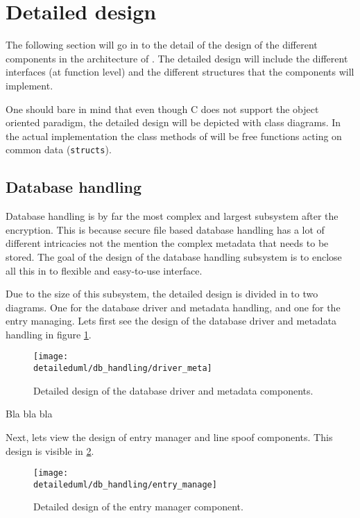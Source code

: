 \section{Detailed design}

The following section will go in to the detail of the design of the different
components in the architecture of \pman. The detailed design will include the
different interfaces (at function level) and the different structures that the
components will implement.

One should bare in mind that even though C does not support the object oriented
paradigm, the detailed design will be depicted with class diagrams. In the
actual implementation the class methods of will be free functions acting on
common data (\texttt{structs}).

\subsection{Database handling}

Database handling is by far the most complex and largest subsystem after
the encryption. This is because secure file based database handling has a lot
of different intricacies not the mention the complex metadata that needs to
be stored. The goal of the design of the database handling subsystem is to
enclose all this in to flexible and easy-to-use interface.

Due to the size of this subsystem, the detailed design is divided in to two
diagrams. One for the database driver and metadata handling, and one for the
entry managing. Lets first see the design of the database driver and metadata
handling in figure \ref{dia:driver_meta}.

\begin{figure}[H]
    \centering
    \centerline{\texttt{[image: \\detaileduml/db\_handling/driver\_meta]}}
    \caption{Detailed design of the database driver and metadata components.}
    \label{dia:driver_meta}
\end{figure}

Bla bla bla

Next, lets view the design of entry manager and line spoof components. This
design is visible in \ref{dia:entry_manage}.

\begin{figure}[H]
    \centering
    \centerline{\texttt{[image: \\detaileduml/db\_handling/entry\_manage]}}
    \caption{Detailed design of the entry manager component.}
    \label{dia:entry_manage}
\end{figure}

